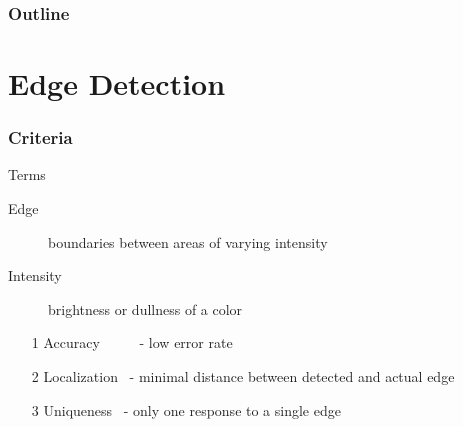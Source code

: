 \documentclass{beamer}
\newcommand{\linespace}{\vskip 0.25cm}
\begin{document}
\begin{frame}
  \frametitle{Outline}
  \tableofcontents[hideallsubsections]
\end{frame}

\section[Edge Detection]{Edge Detection}

\begin{frame}
\frametitle{Criteria}
Terms
\begin{description}
\item[Edge] boundaries between areas of varying intensity
\item[Intensity] brightness or dullness of a color
\end{description}
\linespace
\linespace
\begin{enumerate}
\item[1] Accuracy \ \ \ \ \ - low error rate
\item[2] Localization \ - minimal distance between detected and actual edge
\item[3] Uniqueness \ - only one response to a single edge
\end{enumerate}
\end{frame}
\end{document}
